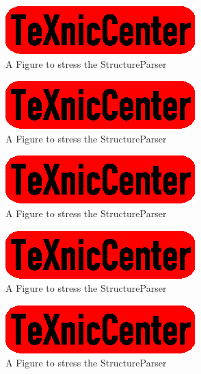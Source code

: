 \begin{figure}
	\begin{center}
		\includegraphics{txc.eps}
	\end{center}
	\caption{A Figure to stress the StructureParser}
\end{figure}

\begin{figure}
	\begin{center}
		\includegraphics{txc.eps}
	\end{center}
	\caption{A Figure to stress the StructureParser}
\end{figure}


\clearpage


\begin{figure}
	\begin{center}
		\includegraphics{txc.eps}
	\end{center}
	\caption{A Figure to stress the StructureParser}
\end{figure}

\begin{figure}
	\begin{center}
		\includegraphics{txc.eps}
	\end{center}
	\caption{A Figure to stress the StructureParser}
\end{figure}

\begin{figure}
	\begin{center}
		\includegraphics{txc.eps}
	\end{center}
	\caption{A Figure to stress the StructureParser}
\end{figure}

